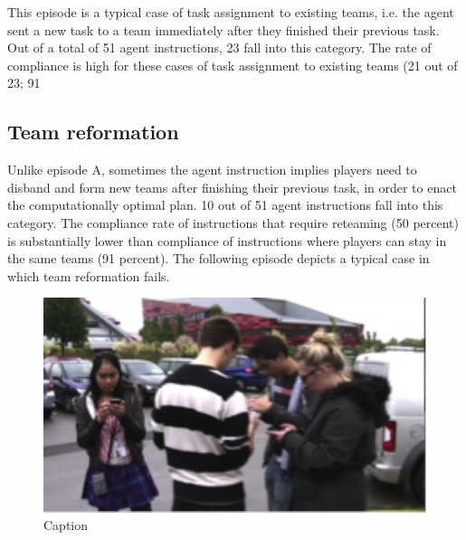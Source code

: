 This episode is a typical case of task assignment to existing teams, i.e. the agent sent a new task to a team immediately after they finished their previous task. Out of a total of 51 agent instructions, 23 fall into this category. The rate of compliance is high for these cases of task assignment to existing teams (21 out of 23; 91%

\subsection{Team reformation}
Unlike episode A, sometimes the agent instruction implies players need to disband and form new teams after finishing their previous task, in order to enact the computationally optimal plan. 10 out of 51 agent instructions fall into this category. The compliance rate of instructions that require reteaming (50 percent) is substantially lower than compliance of instructions where players can stay in the same teams (91 percent). The following episode depicts a typical case in which team reformation fails.\\


\begin{figure}[ht]
 \includegraphics[width=1\textwidth]{img/study2/ep2/ep21}
\caption{Caption}
\label{fig:study2ep21}
\end{figure}

\hfill \break


